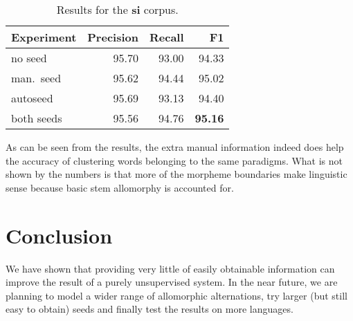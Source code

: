 \documentclass{itatnew}
\begin{document}
\begin{table}[h]
\begin{center}
\begin{tabular}{|l|r|r|r|}
\hline \bf Experiment & \bf Precision & \bf Recall & \bf F1\\ \hline
no seed & 95.70 & 93.00 & 94.33\\
man.~seed & 95.62 & 94.44 & 95.02 \\
autoseed & 95.69 & 93.13 & 94.40\\
both seeds & 95.56  & 94.76 & \bf 95.16\\
\hline
\end{tabular}
\end{center}
\caption{\label{table:res-si} Results for the \textbf{si} corpus.}
\end{table}

As can be seen from the results, the extra manual information indeed does help the accuracy of clustering words belonging to the same paradigms.
What is not shown by the numbers is that more of the morpheme boundaries make linguistic sense because basic stem allomorphy is accounted for. 

\section{Conclusion}

We have shown that providing very little of easily obtainable information can improve the result of a purely unsupervised system. In the near future, we are planning to model a wider range of allomorphic alternations, try larger (but still easy to obtain) seeds and finally test the results on more languages.

%
%

{}
\end{document}
